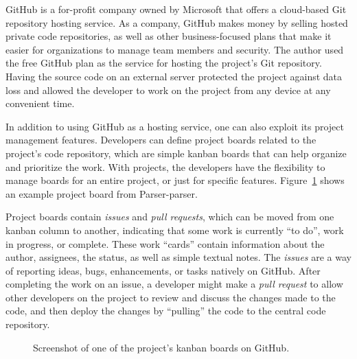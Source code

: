 \documentclass[english,bachelors,forcepolishlogotype]{wizthesis}
\newcommand{\thisproject}{Parser-parser}
\begin{document}
GitHub \cite{github} is a for-profit company owned by Microsoft that offers a
cloud-based Git repository hosting service. As a company, GitHub makes money by
selling hosted private code repositories, as well as other business-focused
plans that make it easier for organizations to manage team members and security.
The author used the free GitHub plan as the service for hosting the project's
Git repository. Having the source code on an external server protected the
project against data loss and allowed the developer to work on the project from
any device at any convenient time.

In addition to using GitHub as a hosting service, one can also exploit its
project management features. Developers can define project boards related to the
project's code repository, which are simple kanban \cite{ahmad-2013} boards that
can help organize and prioritize the work. With projects, the developers have
the flexibility to manage boards for an entire project, or just for specific
features. Figure~\ref{fig:github-projects} shows an example project board from
\thisproject{}.

Project boards contain \emph{issues} and \emph{pull requests}, which can be
moved from one kanban column to another, indicating that some work is currently
``to do'', work in progress, or complete. These work ``cards'' contain
information about the author, assignees, the status, as well as simple textual
notes. The \emph{issues} are a way of reporting ideas, bugs, enhancements, or
tasks natively on GitHub. After completing the work on an issue, a developer
might make a \emph{pull request} to allow other developers on the project to
review and discuss the changes made to the code, and then deploy the changes by
``pulling'' the code to the central code repository.

\begin{figure}[h]
  \centering
  \caption{Screenshot of one of the project's kanban boards on GitHub.}
  \label{fig:github-projects}
\end{figure}
\end{document}
